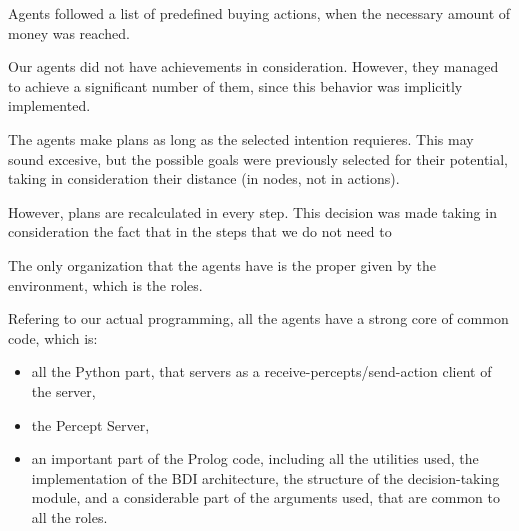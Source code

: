 \documentclass{llncs2e/llncs}
\begin{document}
    Agents followed a list of predefined buying actions, when the necessary amount 
    of money was reached.

    Our agents did not have achievements in consideration. However, they managed 
    to achieve a significant number of them, since this behavior was implicitly 
    implemented.

    The agents make plans as long as the selected intention requieres. This may 
    sound excesive, but the possible goals were previously selected for their 
    potential, taking in consideration their distance (in nodes, not in actions).

    However, plans are recalculated in every step. This decision was made taking 
    in consideration the fact that in the steps that we do not need to 

\begin{comment}
PREGUNTAS {
1. What is the main strategy of your team?
2. How does the overall team work together? (coordination, information 
sharing, ...)
3. How do your agents analyze the topology of the map? And how do they exploit 
their findings?
4. How do your agents communicate with the server?
5. How do you implement the roles of the agents? Which strategies do the 
different roles implement?
6. How do you find good zones? How do you estimate the value of zones?
7. How do you conquer zones? How do you defend zones if attacked? Do you 
attack zones?
8. Can your agents change their behavior during runtime? If so, what triggers 
the changes?
9. What algorithm(s) do you use for agent path planning?
10. How do you make use of the buying-mechanism?
11. How important are achievements for your overall strategy?
12. Do your agents have an explicit mental state?
13. How do your agents communicate? And what do they communicate?
14. How do you organize your agents? Do you use e.g. hierarchies? Is your 
organization implicit or explicit?
15. Is most of your agents’ behavior emergent on and individual and team level?
16. If your agents perform some planning, how many steps do they plan ahead?
}
\end{comment}

    The only organization that the agents have is the proper given by the 
    environment, which is the roles. 
    
    Refering to our actual programming, all the agents have a strong core of common
    code, which is:
    \begin{itemize}
        \item all the Python part, that servers as a receive-percepts/send-action client 
        of the server,
        
        \item the Percept Server,
        
        \item an important part of the Prolog code, including all the utilities used, the
        implementation of the BDI architecture, the structure of the 
        decision-taking module, and a considerable part of the arguments used, that
        are common to all the roles.
    \end{itemize}
    
\end{document}
